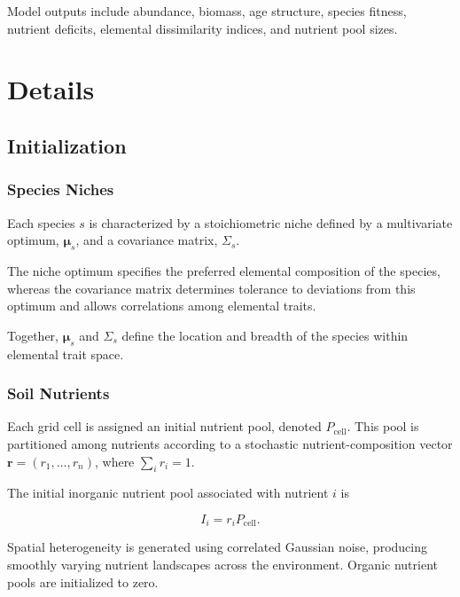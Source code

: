 Model outputs include abundance, biomass, age structure, species fitness, nutrient deficits, elemental dissimilarity indices, and nutrient pool sizes.


\section{Details}


\subsection{Initialization}

\subsubsection{Species Niches}

Each species $s$ is characterized by a stoichiometric niche defined by a multivariate optimum, $\boldsymbol{\mu}_s$, and a covariance matrix, $\Sigma_s$.

The niche optimum specifies the preferred elemental composition of the species, whereas the covariance matrix determines tolerance to deviations from this optimum and allows correlations among elemental traits.

Together, $\boldsymbol{\mu}_s$ and $\Sigma_s$ define the location and breadth of the species within elemental trait space.

\subsubsection{Soil Nutrients}

Each grid cell is assigned an initial nutrient pool, denoted $P_{\mathrm{cell}}$. This pool is partitioned among nutrients according to a stochastic nutrient-composition vector $\mathbf r=(r_1,\ldots,r_n)$, where $\sum_i r_i=1$.

The initial inorganic nutrient pool associated with nutrient $i$ is

\begin{equation}
I_i=r_iP_{\mathrm{cell}}.
\end{equation}

Spatial heterogeneity is generated using correlated Gaussian noise, producing smoothly varying nutrient landscapes across the environment. Organic nutrient pools are initialized to zero.

